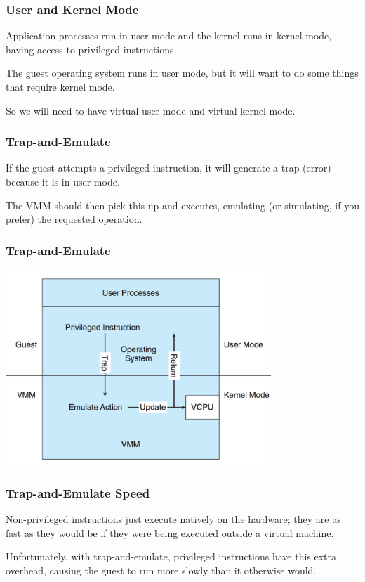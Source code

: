 \begin{frame}
\frametitle{User and Kernel Mode}

Application processes run in user mode and the kernel runs in kernel mode, having access to privileged instructions. 

The guest operating system runs in user mode, but it will want to do some things that require kernel mode.

So we will need to have virtual user mode and virtual kernel mode.

\end{frame}

\begin{frame}
\frametitle{Trap-and-Emulate}

If the guest attempts a privileged instruction, it will generate a trap (error) because it is in user mode. 

The VMM should then pick this up and executes, emulating (or simulating, if you prefer) the requested operation.

\end{frame}

\begin{frame}
\frametitle{Trap-and-Emulate}

\begin{center}
	\includegraphics[width=0.75\textwidth]{images/trap-and-emulate.png}
\end{center}

\end{frame}

\begin{frame}
\frametitle{Trap-and-Emulate Speed}

Non-privileged instructions just execute natively on the hardware; they are as fast as they would be if they were being executed outside a virtual machine. 

Unfortunately, with trap-and-emulate, privileged instructions have this extra overhead, causing the guest to run more slowly than it otherwise would. 

\end{frame}

